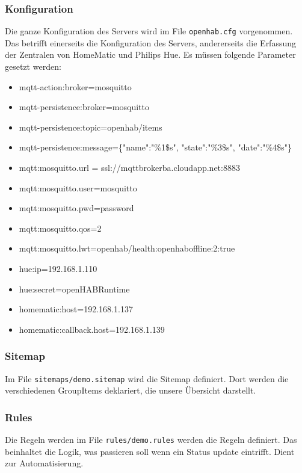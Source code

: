 \subsubsection*{Konfiguration}
Die ganze Konfiguration des Servers wird im File \lstinline!openhab.cfg! vorgenommen. Das betrifft einerseits die Konfiguration des Servers, andererseits die Erfassung der Zentralen von HomeMatic und Philips Hue. Es müssen folgende Parameter gesetzt werden:
\begin{itemize}
	\item mqtt-action:broker=mosquitto
	\item mqtt-persistence:broker=mosquitto
	\item mqtt-persistence:topic=openhab/items
	\item mqtt-persistence:message=\{"name":"\%1\$s", "state":"\%3\$s", "date":"\%4\$s"\}
	\item mqtt:mosquitto.url =  ssl://mqttbrokerba.cloudapp.net:8883
	\item mqtt:mosquitto.user=mosquitto
	\item mqtt:mosquitto.pwd=password
	\item mqtt:mosquitto.qos=2
	\item mqtt:mosquitto.lwt=openhab/health:openhaboffline:2:true
	\item hue:ip=192.168.1.110
	\item hue:secret=openHABRuntime
	\item homematic:host=192.168.1.137
	\item homematic:callback.host=192.168.1.139
\end{itemize}

\subsubsection*{Sitemap}
Im File \lstinline!sitemaps/demo.sitemap! wird die Sitemap definiert. Dort werden die verschiedenen GroupItems deklariert, die unsere Übersicht darstellt.

\subsubsection*{Rules}
Die Regeln werden im File \lstinline!rules/demo.rules! werden die Regeln definiert. Das beinhaltet die Logik, was passieren soll wenn ein Status update eintrifft. Dient zur Automatisierung.

